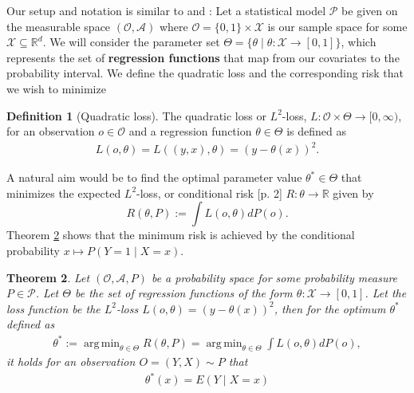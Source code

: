 \documentclass[11pt, a4paper]{article}
\DeclareMathOperator*{\argmin}{arg\,min}
\newtheorem{theorem}{Theorem}
\theoremstyle{definition}
\newtheorem{definition}[theorem]{Definition}
\theoremstyle{remark}
\newcommand{\btheta}{\theta}
\begin{document}
Our setup and notation is similar to \parencite{vaart06} and \parencite{laan03}:
Let a statistical model $ \mathcal{P} $ be given on the measurable space $ (\mathcal{O}, \mathcal{A}) $ where $ \mathcal{O} = \{0,1\} \times \mathcal{X} $ is our sample space for some $ \mathcal{X} \subseteq \mathbb{R}^{d} $. 
We will consider the parameter set $ \Theta = \{\btheta \mid \btheta : \mathcal{X} \to [0,1]\} $, which represents the set of \textbf{regression functions} that map from our covariates to the probability interval. We define the quadratic loss and the corresponding risk that we wish to minimize 
\begin{definition}[Quadratic loss]
    The quadratic loss or $ L^2 $-loss, $ L : \mathcal{O} \times \Theta \to [0, \infty) $, for an observation $ o \in \mathcal{O} $ and a regression function $ \btheta \in \Theta $ is defined as 
\begin{align*}
    L(o, \btheta) = L((y,x), \btheta) = (y - \btheta(x))^2.
\end{align*}
\end{definition}
A natural aim would be to find the optimal parameter value $\btheta^* \in \Theta$ that minimizes the expected $L^2$-loss, or conditional risk \parencite{laan03}[p. 2] $R: \btheta \to \mathbb{R}$ given by 
\begin{equation} \label{l2risk}
    R(\btheta, P) := \int L(o, \btheta)  dP(o).
\end{equation}
Theorem \ref{minrisk} shows that the minimum risk is achieved by the conditional probability $ x \mapsto P(Y = 1\mid X = x) $. 
\begin{theorem} \label{minrisk}
    Let $ (\mathcal{O} , \mathcal{A}, P) $ be a probability space for some probability measure $ P \in \mathcal{P} $. Let $ \Theta $ be the set of regression functions of the form $ \btheta : \mathcal{X} \to [0,1] $. Let the loss function be the $ L^2 $-loss $ L(o, \btheta) = (y - \btheta(x))^2 $, then for the optimum $ \btheta^* $ defined as 
    \begin{align*}
        \btheta^* := \argmin_{\btheta \in \Theta} R(\btheta, P)= \argmin_{\btheta \in \Theta} \int L(o, \btheta)  dP(o),
    \end{align*}
    it holds for an observation $ O = (Y, X) \sim P $ that
    \begin{align*}
        \btheta^{*}(x) = E(Y \mid X = x) 
    \end{align*}
\end{theorem}
\end{document}
